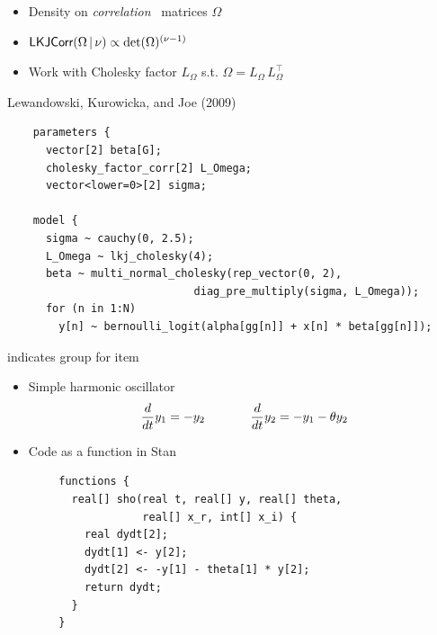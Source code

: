 \documentclass[10pt]{report}
\begin{document}
\begin{itemize}
\item Density on \emph{correlation} \ matrices $\Omega$
%
\item $\text{\sf LKJCorr}(\Omega \, | \, \nu) 
       \propto \mbox{det}(\Omega)^{(\nu - 1)}$
%
\item Work with Cholesky factor $L_{\Omega}$ s.t. $\Omega = L_{\Omega} \, L_{\Omega}^{\top}$
%
\end{itemize}
\vfill
\hfill {\footnotesize Lewandowski, Kurowicka, and Joe (2009)}

\vspace*{-4pt}
{\footnotesize
\begin{Verbatim}
    parameters {
      vector[2] beta[G];  
      cholesky_factor_corr[2] L_Omega;
      vector<lower=0>[2] sigma;

    model {
      sigma ~ cauchy(0, 2.5);
      L_Omega ~ lkj_cholesky(4);
      beta ~ multi_normal_cholesky(rep_vector(0, 2),
                             diag_pre_multiply(sigma, L_Omega));
      for (n in 1:N)
        y[n] ~ bernoulli_logit(alpha[gg[n]] + x[n] * beta[gg[n]]);
\end{Verbatim}
}
\vspace*{6pt}
\begin{subitemize}
\item {} indicates group for item 
\end{subitemize}



\begin{itemize}
\item Simple harmonic oscillator
{\small
\begin{equation*}
\frac{d}{dt} y_1 = -y_2 
\hspace*{0.5in}
\frac{d}{dt} y_2 = -y_1 - \theta y_2
\end{equation*}
}
\item Code as a function in Stan
\end{itemize}
{\footnotesize
\begin{Verbatim}
        functions {
          real[] sho(real t, real[] y, real[] theta,
                     real[] x_r, int[] x_i) {
            real dydt[2];
            dydt[1] <- y[2];
            dydt[2] <- -y[1] - theta[1] * y[2];
            return dydt;
          }
        }
\end{Verbatim}
}
\end{document}
